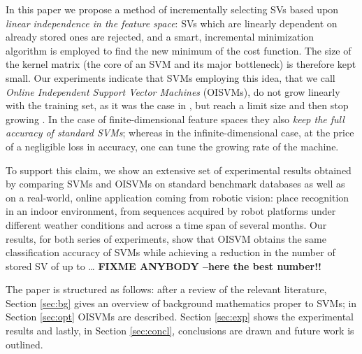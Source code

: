 In this paper we propose a method of incrementally selecting SVs based
upon \emph{linear independence in the feature space}: SVs which are
linearly dependent on already stored ones are rejected, and a smart,
incremental minimization algorithm is employed to find the new minimum
of the cost function. The size of the kernel matrix (the core of an
SVM and its major bottleneck) is therefore kept small. Our experiments
indicate that SVMs employing this idea, that we call
\emph{Online Independent Support Vector Machines} (OISVMs), do not
grow linearly with the training set, as it was the case in
\cite{Steinwart03}, but reach a limit size and then stop growing
\cite{engel2004}. In the case of finite-dimensional feature spaces
they also \emph{keep the full accuracy of standard SVMs}; whereas in
the infinite-dimensional case, at the price of a negligible loss in
accuracy, one can tune the growing rate of the machine.

To support this claim, we show an extensive set of experimental
results obtained by comparing SVMs and OISVMs on standard benchmark
databases as well as on a real-world, online application coming from
robotic vision: place recognition in an indoor environment, from
sequences acquired by robot platforms under different weather
conditions and across a time span of several months.
Our results, for both series of experiments, show that OISVM
obtains the same classification accuracy of SVMs while achieving
a reduction in the number of stored SV of up to \ldots 
\textbf{FIXME ANYBODY --here the best number!!}

The paper is structured as follows: after a review of the relevant
literature, Section \ref{sec:bg} gives an overview of background
mathematics proper to SVMs; in Section \ref{sec:opt} OISVMs are
described.  Section \ref{sec:exp}  shows the experimental results
and lastly, in Section \ref{sec:concl}, conclusions are drawn and future
work is outlined.
